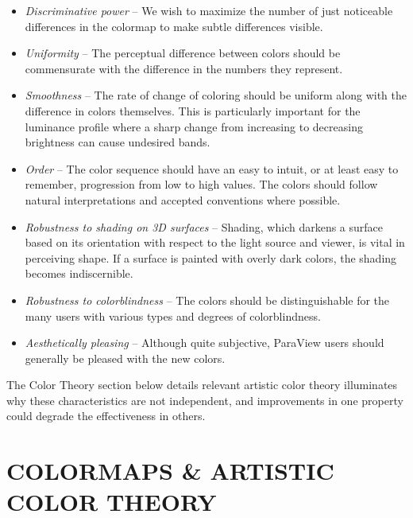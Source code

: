 \documentclass{IEEEcsmag}
\begin{document}
\begin{itemize}

\item \emph{Discriminative power} --
  We wish to maximize the number of just noticeable differences in the colormap to make subtle differences visible.
\item \emph{Uniformity} --
  The perceptual difference between colors should be commensurate with the difference in the numbers they represent.
\item \emph{Smoothness} --
  The rate of change of coloring should be uniform along with the difference in colors themselves.
  This is particularly important for the luminance profile where a sharp change from increasing to decreasing brightness can cause undesired bands.
\item \emph{Order} --
  The color sequence should have an easy to intuit, or at least easy to remember, progression from low to high values.
  The colors should follow natural interpretations and accepted conventions where possible.
\item \emph{Robustness to shading on 3D surfaces} -- Shading, which darkens a surface based on its orientation with respect to the light source and viewer, is vital in perceiving shape.
  If a surface is painted with overly dark colors, the shading becomes indiscernible.
\item \emph{Robustness to colorblindness} --
  The colors should be distinguishable for the many users with various types and degrees of colorblindness.
\item \emph{Aesthetically pleasing} --
  Although quite subjective, ParaView users should generally be pleased with the new colors.

\end{itemize}

The Color Theory section below details relevant artistic color theory illuminates why these characteristics are not independent, and improvements in one property could degrade the effectiveness in others.




\section {COLORMAPS \& ARTISTIC COLOR THEORY}
\end{document}
